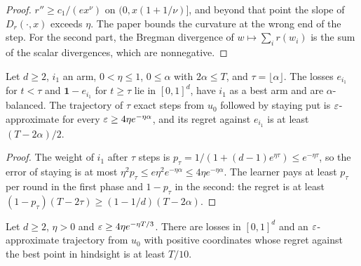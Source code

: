 \begin{proof}
  \leanok
  $r'' \ge c_1/(e x^\nu)$ on $(0, x(1 + 1/\nu)]$, and beyond that point the slope of $D_r(\cdot, x)$
  exceeds $\eta$. The paper bounds the curvature at the wrong end of the step. For the second part,
  the Bregman divergence of $w \mapsto \sum_i r(w_i)$ is the sum of the scalar divergences, which are
  nonnegative.
\end{proof}

\begin{lemma}
  \label{lem:balance_lower_bound}
  \leanok
  Let $d \ge 2$, $i_1$ an arm, $0 < \eta \le 1$, $0 \le \alpha$ with $2\alpha \le T$, and
  $\tau = \lfloor\alpha\rfloor$. The losses $e_{i_1}$ for $t < \tau$ and $\mathbf 1 - e_{i_1}$ for
  $t \ge \tau$ lie in $[0, 1]^d$, have $i_1$ as a best arm and are $\alpha$-balanced. The trajectory of
  $\tau$ exact steps from $u_0$ followed by staying put is $\varepsilon$-approximate for every
  $\varepsilon \ge 4\eta e^{-\eta\alpha}$, and its regret against $e_{i_1}$ is at least $(T - 2\alpha)/2$.
\end{lemma}

\begin{proof}
  \leanok
  The weight of $i_1$ after $\tau$ steps is $p_\tau = 1/(1 + (d-1)e^{\eta\tau}) \le e^{-\eta\tau}$, so
  the error of staying is at most $\eta^2 p_\tau \le e\eta^2e^{-\eta\alpha} \le 4\eta e^{-\eta\alpha}$.
  The learner pays at least $p_\tau$ per round in the first phase and $1 - p_\tau$ in the second:
  the regret is at least $(1 - p_\tau)(T - 2\tau) \ge (1 - 1/d)(T - 2\alpha)$.
\end{proof}

\begin{theorem}
  \label{thm:lb_barrier_adversarial}
  \leanok
  Let $d \ge 2$, $\eta > 0$ and $\varepsilon \ge 4\eta e^{-\eta T/3}$. There are losses in $[0, 1]^d$ and an
  $\varepsilon$-approximate trajectory from $u_0$ with positive coordinates whose regret against the best
  point in hindsight is at least $T/10$.
\end{theorem}

